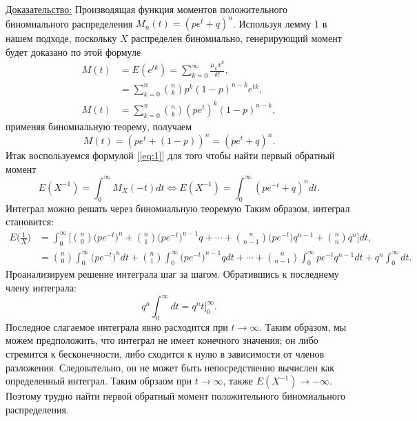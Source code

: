 \documentclass[13pt]{article}
\begin{document}
\underline{Доказательство:} Производящая функция моментов положительного биномиального распределения $M_{n}(t)=(pe^{t}+ q)^{n}$. Используя лемму 1 в нашем подходе, поскольку $X$ распределен биномиально, генерирующий момент будет доказано по этой формуле
\begin{align*}
M(t) &= E(e^{tk}) = \sum_{k=0}^{\infty}\frac{\mu_{k}x^{k}}{k!}, \\
     &= \sum_{k=0}^{n}\binom{n}{k}p^{k}(1-p)^{n-k}e^{tk},\\
 M(t)    &=\sum_{k=0}^{n}\binom{n}{k}(pe^{t})^{k}(1-p)^{n-k},
\end{align*}
применяя биномиальную теорему, получаем
\[
 M(t) = (pe^{t}+(1-p))^{n} = (pe^{t}+ q)^{n}.
\]   
Итак воспользуемся формулой [\ref{eq:1}] для того чтобы  найти первый обратный момент 
\begin{equation*}
     E(X^{-1}) = \int_{0}^{\infty} M_{X}(-t)dt \Longleftrightarrow E(X^{-1}) = \int_{0}^{\infty} (pe^{-t}+ q)^{n}dt.
\end{equation*}
Интеграл можно решать через биномиальную теоремую  Таким образом, интеграл становится:
\begin{align*}
    E\bigg(\frac{1}{X}\bigg) &= \int_{0}^{\infty}\bigg[ \binom{n}{0}\big(pe^{-t} \big)^{n} + \binom{n}{1} \big(pe^{-t} \big)^{n-1}q + \cdots + \binom{n}{n-1}\big(pe^{-t} \big)q^{n-1} + \binom{n}{n}q^{n} \bigg]dt,\\
    &= \binom{n}{0} \int_{0}^{\infty}\big(pe^{-t} \big)^{n} dt + \binom{n}{1} \int_{0}^{\infty} \big(pe^{-t} \big)^{n-1}q dt  + \cdots + \binom{n}{n-1} \int_{0}^{\infty} pe^{-t} q^{n-1} dt + q^{n} \int_{0}^{\infty} dt.
\end{align*} 
Проанализируем решение интеграла шаг за шагом. Обратившись к последнему члену интеграла:
\[
 q^{n} \int_{0}^{\infty} dt = q^{n} t \Bigg]_{0}^{\infty}.
\]
Последное слагаемое интеграла явно расходится при $t \to \infty$. Таким образом, мы можем предположить, что интеграл не имеет конечного значения; он либо стремится к бесконечности, либо сходится к нулю в зависимости от членов разложения. 
Следовательно, он не может быть непосредственно вычислен как определенный интеграл.
Таким обрзаом при $t \to \infty$, также  $E(X^{-1}) \to -\infty$. Поэтому трудно найти первой обратный момент положительного биномиального распределения. 
\end{document}
